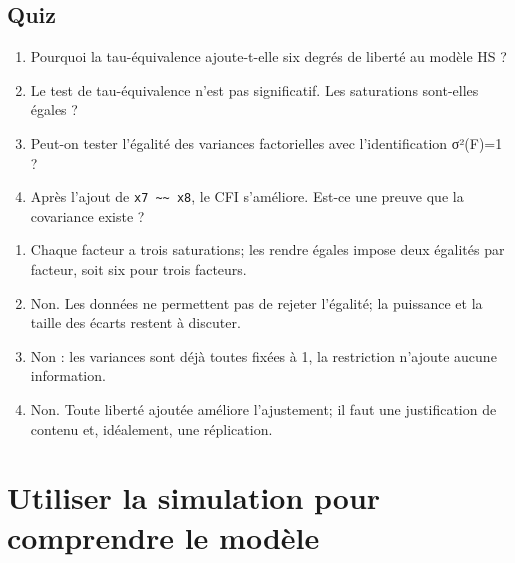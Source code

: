 \documentclass[
  french,
  11pt,
  a4paper,
  DIV=11,
  numbers=noendperiod]{scrreprt}
\providecommand{\tightlist}{%
  \setlength{\itemsep}{0pt}\setlength{\parskip}{0pt}}
\begin{document}
\section{Quiz}\label{quiz-9}

\begin{enumerate}
\def\labelenumi{\arabic{enumi}.}
\tightlist
\item
  Pourquoi la tau-équivalence ajoute-t-elle six degrés de liberté au
  modèle HS ?
\item
  Le test de tau-équivalence n'est pas significatif. Les saturations
  sont-elles égales ?
\item
  Peut-on tester l'égalité des variances factorielles avec
  l'identification σ²(F)=1 ?
\item
  Après l'ajout de \texttt{x7\ \textasciitilde{}\textasciitilde{}\ x8},
  le CFI s'améliore. Est-ce une preuve que la covariance existe ?
\end{enumerate}

\begin{tcolorbox}[enhanced jigsaw, arc=.35mm, bottomrule=.15mm, bottomtitle=1mm, breakable, colback=white, colbacktitle=quarto-callout-tip-color!10!white, colframe=quarto-callout-tip-color-frame, coltitle=black, left=2mm, leftrule=.75mm, opacityback=0, opacitybacktitle=0.6, rightrule=.15mm, title={Réponses}, titlerule=0mm, toprule=.15mm, toptitle=1mm]

\begin{enumerate}
\def\labelenumi{\arabic{enumi}.}
\tightlist
\item
  Chaque facteur a trois saturations; les rendre égales impose deux
  égalités par facteur, soit six pour trois facteurs.
\item
  Non. Les données ne permettent pas de rejeter l'égalité; la puissance
  et la taille des écarts restent à discuter.
\item
  Non : les variances sont déjà toutes fixées à 1, la restriction
  n'ajoute aucune information.
\item
  Non. Toute liberté ajoutée améliore l'ajustement; il faut une
  justification de contenu et, idéalement, une réplication.
\end{enumerate}

\end{tcolorbox}


\chapter{Utiliser la simulation pour comprendre le
modèle}\label{sec-simulation}
\end{document}
